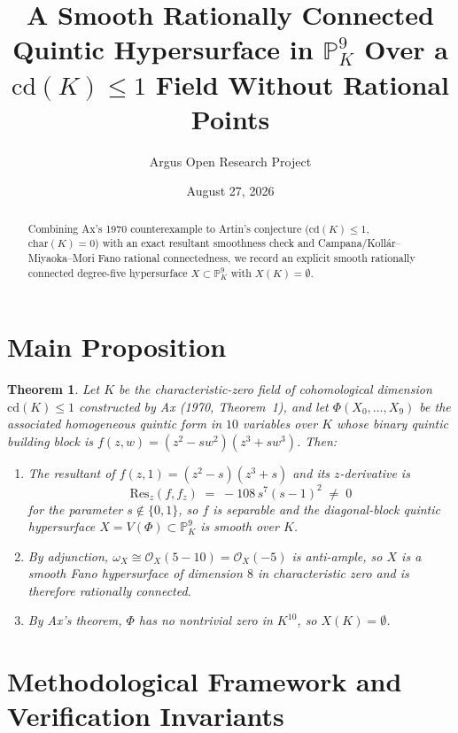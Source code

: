 \documentclass[10pt,reqno]{amsart}
\title[Smooth Rationally Connected Quintic Hypersurface Over a $\mathrm{cd}(K)\le 1$ Field]
{A Smooth Rationally Connected Quintic Hypersurface in $\mathbb{P}^9_K$ Over a $\mathrm{cd}(K)\le 1$ Field Without Rational Points}
\author{Argus Open Research Project}
\date{August 27, 2026}
\newtheorem{theorem}{Theorem}[section]
\theoremstyle{definition}
\begin{document}
\begin{abstract}
Combining Ax's 1970 counterexample to Artin's conjecture ($\mathrm{cd}(K)\le 1$, $\mathrm{char}(K)=0$) with an exact resultant smoothness check and Campana/Koll\'ar--Miyaoka--Mori Fano rational connectedness, we record an explicit smooth rationally connected degree-five hypersurface $X\subset\mathbb{P}^9_K$ with $X(K)=\emptyset$.
\end{abstract}
\maketitle
\section{Main Proposition}
\begin{theorem}
Let $K$ be the characteristic-zero field of cohomological dimension $\mathrm{cd}(K)\le 1$ constructed by Ax (1970, Theorem~1), and let $\Phi(X_0,\dots,X_9)$ be the associated homogeneous quintic form in $10$ variables over $K$ whose binary quintic building block is $f(z,w)=(z^2-sw^2)(z^3+sw^3)$. Then:
\begin{enumerate}[label=\textup{(\arabic*)}]
  \item The resultant of $f(z,1)=(z^2-s)(z^3+s)$ and its $z$-derivative is
  \[
    \mathrm{Res}_z(f, f_z) \;=\; -108\, s^7 (s-1)^2 \;\neq\; 0
  \]
  for the parameter $s\notin\{0,1\}$, so $f$ is separable and the diagonal-block quintic hypersurface $X = V(\Phi)\subset\mathbb{P}^9_K$ is smooth over $K$.
  \item By adjunction, $\omega_X \cong \mathcal{O}_X(5-10)=\mathcal{O}_X(-5)$ is anti-ample, so $X$ is a smooth Fano hypersurface of dimension $8$ in characteristic zero and is therefore rationally connected.
  \item By Ax's theorem, $\Phi$ has no nontrivial zero in $K^{10}$, so $X(K)=\emptyset$.
\end{enumerate}
\end{theorem}

\section{Methodological Framework and Verification Invariants}
\end{document}
